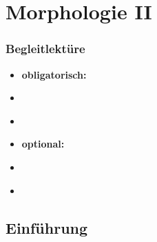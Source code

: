 

\nocite{Eisenberg00a}
\nocite{Fleischer00a} %
\nocite{Fleischer&Barz12a} %
\nocite{Fries&MyP16j} %
\nocite{Fuhrhop96a} %
\nocite{Fuhrhop00a} %
\nocite{Grewendorf&Co91a} %
\nocite{Haspelmath2002a}
\nocite{MyP18b} %
\nocite{Olsen86a} %
\nocite{Olsen14a} %
\nocite{Wegener03b} %
\nocite{Wurzel00a} %
\nocite{Wurzel00b} %


\section{Morphologie II}

\begin{frame}
\frametitle{Begleitlektüre}

\begin{itemize}
	\item \textbf{obligatorisch:}
	\item[] \citet[41--45]{Abramowski2016a}
	\item[] \citet[Kap. 2, S. 48--66]{Meibauer&Co07a}
	\item \textbf{optional:}
	\item[] \citet[Kap. 2, S. 29--36]{Meibauer&Co07a}
	\item[] \citet[Kap.~7]{Luedeling2009a}
	
\end{itemize}

\end{frame}


\subsection{Einführung}

